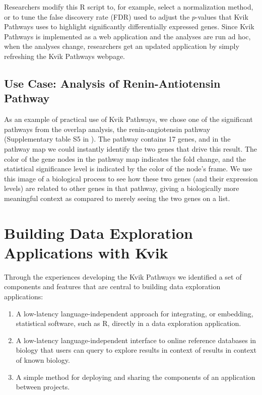 Researchers modify this R script to, for example, select a normalization method,
or to tune the false discovery rate (FDR) used to adjust the $p$-values that
Kvik Pathways uses to highlight significantly differentially expressed genes.
Since Kvik Pathways is implemented as a web application and the analyses are run
ad hoc, when the analyses change, researchers get an updated application by
simply refreshing the Kvik Pathways webpage.

\subsection{Use Case: Analysis of Renin-Antiotensin Pathway}
As an example of practical use of Kvik Pathways, we chose one of the
significant pathways from the overlap analysis, the renin-angiotensin
pathway (Supplementary table S5 in \cite{olsen2013plasma}). The pathway
contains 17 genes, and in the pathway map we could instantly identify the
two genes that drive this result. The color of the gene nodes in the pathway
map indicates the fold change, and the statistical significance level is
indicated by the color of the node's frame.  We use this image of a
biological process to see how these two genes (and their expression levels)
are related to other genes in that pathway, giving a biologically more
meaningful context as compared to merely seeing the two genes on a list.

\section{Building Data Exploration Applications with Kvik}\label{kviksec}\label{challengeref} 
Through the experiences developing the Kvik Pathways we identified a set of
components and features that are central to building data exploration
applications: 

\begin{enumerate}
    \item A low-latency language-independent approach for integrating, or
        embedding, statistical software, such as R, directly in a data
        exploration application. 
    \item A low-latency language-independent interface to online reference
        databases in biology that users can query to explore results in context
        of results in context of known biology. 
    \item A simple method for deploying and sharing the components of an
        application between projects. 
\end{enumerate} 

